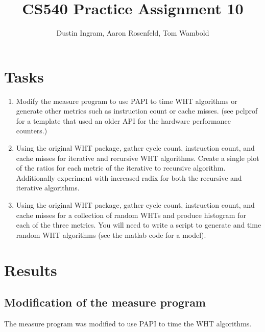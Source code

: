 \documentclass{article}
\title{CS540 Practice Assignment 10}
\author{Dustin Ingram, Aaron Rosenfeld, Tom Wambold}
\begin{document}
\maketitle
\newpage
\section{Tasks}
\begin{enumerate}
    \item Modify the measure program to use PAPI to time WHT algorithms or generate other metrics such as instruction count or cache misses. (see pclprof for a template that used an older API for the hardware performance counters.)
    \item Using the original WHT package, gather cycle count, instruction count, and cache misses for iterative and recursive WHT algorithms. Create a single plot of the ratios for each metric of the iterative to recursive algorithm. Additionally experiment with increased radix for both the recursive and iterative algorithms.
    \item Using the original WHT package, gather cycle count, instruction count, and cache misses for a collection of random WHTs and produce histogram for each of the three metrics. You will need to write a script to generate and time random WHT algorithms (see the matlab code for a model).
\end{enumerate}
\section{Results}
\subsection{Modification of the measure program}
The measure program was modified to use PAPI to time the WHT algorithms.
\end{document}
